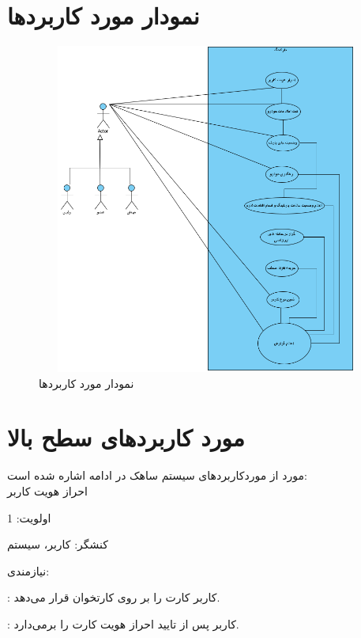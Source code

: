 \documentclass[oneside,a4paper,12pt]{book}
\begin{document}
\section{نمودار مورد کاربردها}
\begin{figure}[h]
	\begin{center}
		\includegraphics[height=10.9cm, width=13cm]{Use_Case_Diagram.png}
		\caption{نمودار مورد کاربردها}
	\end{center}
\end{figure}
\section{مورد کاربردهای سطح بالا}
 مورد از موردکاربردهای سیستم ساهک در ادامه اشاره شده است:\\

\lr{\textbf{-}} \hspace{5 mm}  احراز هویت کاربر

\hspace{8 mm}	اولویت: 1
	
\hspace{8 mm}	کنشگر: کاربر، سیستم
	
\hspace{8 mm}	نیازمندی: 
	
\hspace{16 mm}	: کاربر کارت را بر روی کارتخوان قرار می‌دهد.
	
\hspace{16 mm}	: کاربر پس از تایید احراز هویت کارت را برمی‌دارد.\\
\end{document}

